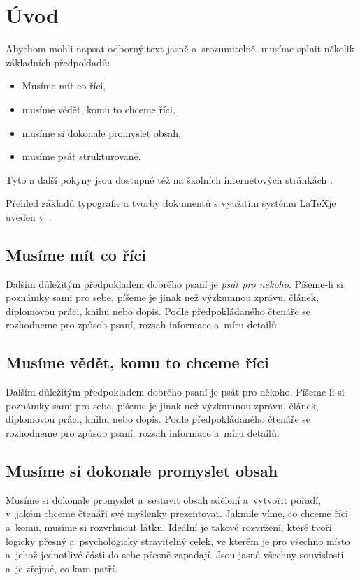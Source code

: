 
\chapter{Úvod}
Abychom mohli napsat odborný text jasně a~srozumitelně, musíme splnit několik základních předpokladů:
\begin{itemize}
\item Musíme mít co říci,
\item musíme vědět, komu to chceme říci,
\item musíme si dokonale promyslet obsah,
\item musíme psát strukturovaně. 
\end{itemize}

Tyto a další pokyny jsou dostupné též na školních internetových stránkách \cite{fitWeb}.

Přehled základů typografie a tvorby dokumentů s využitím systému \LaTeX je 
uveden v~\cite{Rybicka}.

\section{Musíme mít co říci}
Dalším důležitým předpokladem dobrého psaní je {\it psát pro někoho}. Píšeme-li si poznámky sami pro sebe, píšeme je jinak než výzkumnou zprávu, článek, diplomovou práci, knihu nebo dopis. Podle předpokládaného čtenáře se rozhodneme pro způsob psaní, rozsah informace a~míru detailů.

\section{Musíme vědět, komu to chceme říci}
Dalším důležitým předpokladem dobrého psaní je psát pro někoho. Píšeme-li si poznámky sami pro sebe, píšeme je jinak než výzkumnou zprávu, článek, diplomovou práci, knihu nebo dopis. Podle předpokládaného čtenáře se rozhodneme pro způsob psaní, rozsah informace a~míru detailů.

\section{Musíme si dokonale promyslet obsah}
Musíme si dokonale promyslet a~sestavit obsah sdělení a~vytvořit pořadí, v~jakém chceme čtenáři své myšlenky prezentovat. 
Jakmile víme, co chceme říci a~komu, musíme si rozvrhnout látku. Ideální je takové rozvržení, které tvoří logicky přesný a~psychologicky stravitelný celek, ve kterém je pro všechno místo a~jehož jednotlivé části do sebe přesně zapadají. Jsou jasné všechny souvislosti a~je zřejmé, co kam patří.

